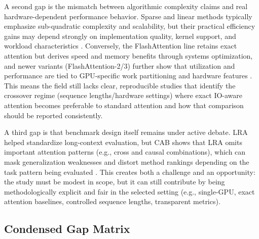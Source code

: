 \documentclass[12pt, a4paper]{article}
\begin{document}
A second gap is the mismatch between algorithmic complexity claims and real hardware-dependent performance behavior. Sparse and linear methods typically emphasize sub-quadratic complexity and scalability, but their practical efficiency gains may depend strongly on implementation quality, kernel support, and workload characteristics \parencite{choromanski2022rethinkingattentionperformers, wang2020linformerselfattentionlinearcomplexity, xiong2021nystromformernystrombasedalgorithmapproximating}. Conversely, the FlashAttention line retains exact attention but derives speed and memory benefits through systems optimization, and newer variants (FlashAttention-2/3) further show that utilization and performance are tied to GPU-specific work partitioning and hardware features \parencite{dao2023flashattention2fasterattentionbetter, shah2024flashattention3fastaccurateattention}. This means the field still lacks clear, reproducible studies that identify the crossover regime (sequence lengths/hardware settings) where exact IO-aware attention becomes preferable to standard attention and how that comparison should be reported consistently.

A third gap is that benchmark design itself remains under active debate. LRA helped standardize long-context evaluation, but CAB shows that LRA omits important attention patterns (e.g., cross and causal combinations), which can mask generalization weaknesses and distort method rankings depending on the task pattern being evaluated \parencite{tay2020longrangearenabenchmark, zhang2025cabcomprehensiveattentionbenchmarking}. This creates both a challenge and an opportunity: the study must be modest in scope, but it can still contribute by being methodologically explicit and fair in the selected setting (e.g., single-GPU, exact attention baselines, controlled sequence lengths, transparent metrics).

\subsection{Condensed Gap Matrix}
\end{document}
